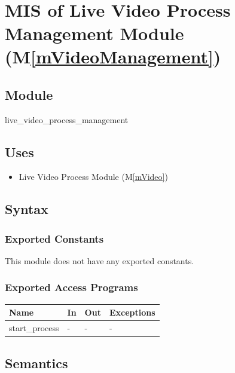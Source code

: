 \documentclass[12pt, titlepage]{article}
\newcommand{\mref}[1]{M\ref{#1}}
\begin{document}
\ \

\section{MIS of Live Video Process Management Module (\mref{mVideoManagement})}

\subsection{Module}

live\_video\_process\_management

\subsection{Uses}

\begin{itemize}
  \item Live Video Process Module (\mref{mVideo})
\end{itemize}

\subsection{Syntax}

\subsubsection{Exported Constants}

This module does not have any exported constants.

\subsubsection{Exported Access Programs}

\begin{center}
  \begin{tabular}{p{3cm} p{4cm} p{4cm} p{3.5cm}}
    \hline
    \textbf{Name}  & \textbf{In} & \textbf{Out} & \textbf{Exceptions} \\
    \hline
    start\_process & -           & -            & -                   \\
    \hline
  \end{tabular}
\end{center}

\subsection{Semantics}
\end{document}
